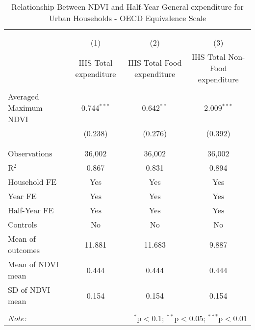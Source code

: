 
\begin{table}[!htbp] \centering 
  \caption{Relationship Between NDVI and Half-Year General expenditure for Urban Households - OECD Equivalence Scale} 
  \label{ndvi_table_5_rural.tex} 
\normalsize 
\begin{tabular}{@{\extracolsep{5pt}}lccc} 
\\[-1.8ex]\hline 
\hline \\[-1.8ex] 
\\[-1.8ex] & (1) & (2) & (3)\\ 
 & IHS Total expenditure & IHS Total Food expenditure & IHS Total Non-Food expenditure \\ 
\hline \\[-1.8ex] 
 Averaged Maximum NDVI & 0.744$^{***}$ & 0.642$^{**}$ & 2.009$^{***}$ \\ 
  & (0.238) & (0.276) & (0.392) \\ 
  & & & \\ 
\hline \\[-1.8ex] 
Observations & 36,002 & 36,002 & 36,002 \\ 
R$^{2}$ & 0.867 & 0.831 & 0.894 \\ 
Household FE & Yes & Yes & Yes \\ 
Year FE & Yes & Yes & Yes \\ 
Half-Year FE & Yes & Yes & Yes \\ 
Controls & No & No & No \\ 
Mean of outcomes & 11.881 & 11.683 & 9.887 \\ 
Mean of NDVI mean & 0.444 & 0.444 & 0.444 \\ 
SD of NDVI mean & 0.154 & 0.154 & 0.154 \\ 
\hline \\[-1.8ex] 
\textit{Note:}  & \multicolumn{3}{r}{$^{*}$p$<$0.1; $^{**}$p$<$0.05; $^{***}$p$<$0.01} \\ 
\end{tabular} 
\end{table} 
